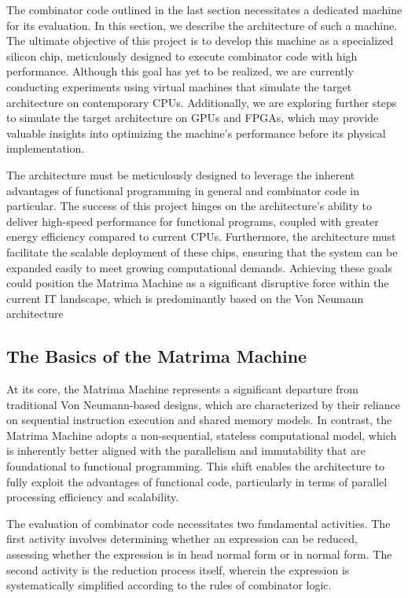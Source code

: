\documentclass{IEEEtran}
\begin{document}
\par The combinator code outlined in the last section necessitates a dedicated machine for its evaluation. In this section, we describe the architecture of such a machine. The ultimate objective of this project is to develop this machine as a specialized silicon chip, meticulously designed to execute combinator code with high performance. Although this goal has yet to be realized, we are currently conducting experiments using virtual machines that simulate the target architecture on contemporary CPUs. Additionally, we are exploring further steps to simulate the target architecture on GPUs and FPGAs, which may provide valuable insights into optimizing the machine's performance before its physical implementation.

\par The architecture must be meticulously designed to leverage the inherent advantages of functional programming in general and combinator code in particular. The success of this project hinges on the architecture’s ability to deliver high-speed performance for functional programs, coupled with greater energy efficiency compared to current CPUs. Furthermore, the architecture must facilitate the scalable deployment of these chips, ensuring that the system can be expanded easily to meet growing computational demands. Achieving these goals could position the Matrima Machine as a significant disruptive force within the current IT landscape, which is predominantly based on the Von Neumann architecture

\subsection{The Basics of the Matrima Machine}

\par At its core, the Matrima Machine represents a significant departure from traditional Von Neumann-based designs, which are characterized by their reliance on sequential instruction execution and shared memory models. In contrast, the Matrima Machine adopts a non-sequential, stateless computational model, which is inherently better aligned with the parallelism and immutability that are foundational to functional programming. This shift enables the architecture to fully exploit the advantages of functional code, particularly in terms of parallel processing efficiency and scalability.

\par The evaluation of combinator code necessitates two fundamental activities. The first activity involves determining whether an expression can be reduced, assessing whether the expression is in head normal form or in normal form. The second activity is the reduction process itself, wherein the expression is systematically simplified according to the rules of combinator logic.
\end{document}
